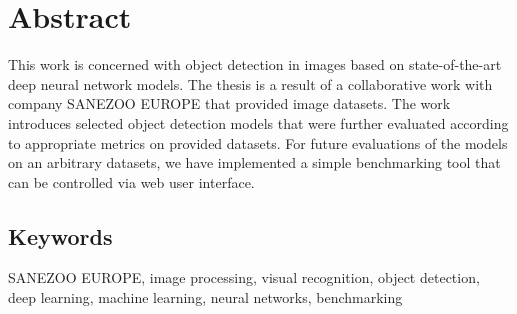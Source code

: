 \chapter*{Abstract}
\noindent
This work is concerned with object detection in images based on state-of-the-art
deep neural network models. The thesis is a result of a collaborative work with
company SANEZOO EUROPE that provided image datasets. The work introduces
selected object detection models that were further evaluated according to
appropriate metrics on provided datasets. For future evaluations of the models
on an arbitrary datasets, we have implemented a simple benchmarking tool that
can be controlled via web user interface.

\section*{Keywords}
\noindent
SANEZOO EUROPE, image processing, visual recognition, object detection, deep
learning, machine learning, neural networks, benchmarking
